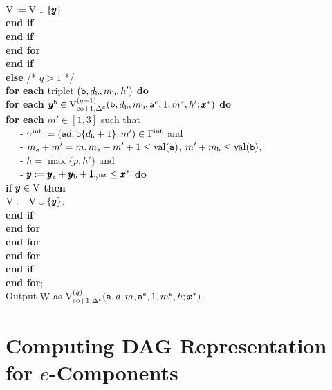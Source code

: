 \documentclass[12pt]{article}
\newcommand{\intt}{\mathrm{int}}
\newcommand{\co}{\mathrm{co}}
\newcommand{\V}{{\rm V}}
\newcommand{\ta}{{\tt a}}
\newcommand{\tb}{{\tt b}}
\newcommand{\y}{\pmb{y}}
\newcommand{\x}{\pmb{x}}
\newcommand{\1}{\pmb{1}}
\newcommand{\0}{\pmb{0}}
\newcommand{\val}{\mathrm{val}}
\newcommand{\W}{\mathrm{W}}
\begin{document}
\begin{tabbing}
                     $\V := \V \cup \{ \y \}$ \- \\
				{\bf end if} \- \\
			{\bf end if} \- \\
			{\bf end for} \- \\
		{\bf end if} \- \\
	{\bf else} /* $q>1$ */ \+ \\
		{\bf for each} triplet  $(\tb, d_{\tb}, m_{\tb}, h')$ {\bf do} \+ \\
		  {\bf for each} $\y^{\tb} \in 
   \V_{\co+1, \Delta^e}^{(q-1)}
                 (\tb,d_{\tb}, m_{\tb}, \ta^e, 1, m^e, h'; \x^*)$
                         {\bf do} \+ \\
            {\bf for each} $m' \in [1, 3]$ such that  \\ 
                      ~~~- $\gamma^{\intt} := (\ta d, \tb  \{d_{\tb} + 1\},
                       m') \in \Gamma^{\intt}$ and\\
                      ~~~- $m_{\ta} + m' = m, 
                      m_{\ta} + m' + 1 \leq \val(\ta)$, 
                      $m' +m_{\tb} \leq \val(\tb)$, \\
                     ~~~- $h = \max\{p, h'\}$ and \\
                      ~~~- $\y:= \y_{\ta} + \y_{\tb} + 
                      \1_{\gamma^{\intt}} \leq \x^*$
                                             {\bf do} \+ \\
                                      {\bf if} $\y \in 
                     \V$ {\bf then} \+ \\                         
                     $\V := \V \cup \{ \y \}$; \- \\
                      {\bf end if} \- \\  
		{\bf end for} \- \\  
		{\bf end for} \- \\
		{\bf end for} \- \\
	{\bf end if} \- \\
{\bf end for}; \\
Output $\W$ as 
$\V_{\co+1, \Delta^e}^{(q)}(\ta, d, m, \ta^e, 1, m^e, h; \x^*)$.
\end{tabbing}
% 
% 
\section{Computing DAG Representation for $e$-Components}
\end{document}
